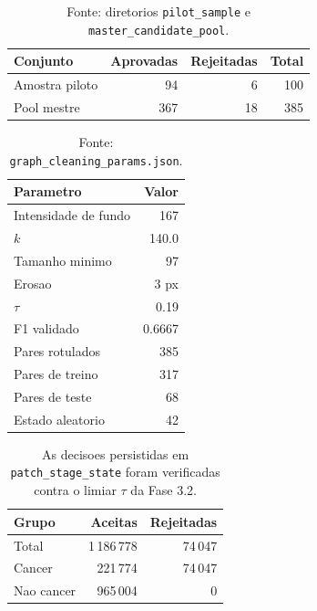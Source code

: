\begin{table}[!htb]
\centering
\caption{Amostras revisadas na Fase 3.1 para DIAGSET.}
\label{tab:results_diagset-stage3-sampling}
\small
\begin{tabular}{lrrr}
\toprule
Conjunto & Aprovadas & Rejeitadas & Total \\
\midrule
Amostra piloto & 94 & 6 & 100 \\
Pool mestre & 367 & 18 & 385 \\
\bottomrule
\end{tabular}
\caption*{\footnotesize Fonte: diretorios \texttt{pilot\_sample} e \texttt{master\_candidate\_pool}.}
\end{table}

\begin{table}[!htb]
\centering
\caption{Parametros otimizados da Fase 3.2 para limpeza por grafos em DIAGSET.}
\label{tab:results_diagset-stage3-graph}
\small
\begin{tabular}{lr}
\toprule
Parametro & Valor \\
\midrule
Intensidade de fundo & 167 \\
$k$ & 140.0 \\
Tamanho minimo & 97 \\
Erosao & 3 px \\
$\tau$ & 0.19 \\
F1 validado & 0.6667 \\
Pares rotulados & 385 \\
Pares de treino & 317 \\
Pares de teste & 68 \\
Estado aleatorio & 42 \\
\bottomrule
\end{tabular}
\caption*{\footnotesize Fonte: \texttt{graph\_cleaning\_params.json}.}
\end{table}

\begin{table}[!htb]
\centering
\caption{Decisoes aplicadas pela Fase 3.3 no manifesto DIAGSET.}
\label{tab:results_diagset-stage3-cleaning}
\small
\begin{tabular}{lrr}
\toprule
Grupo & Aceitas & Rejeitadas \\
\midrule
Total & 1\,186\,778 & 74\,047 \\
Cancer & 221\,774 & 74\,047 \\
Nao cancer & 965\,004 & 0 \\
\bottomrule
\end{tabular}
\caption*{\footnotesize As decisoes persistidas em \texttt{patch\_stage\_state} foram verificadas contra o limiar $\tau$ da Fase 3.2.}
\end{table}
